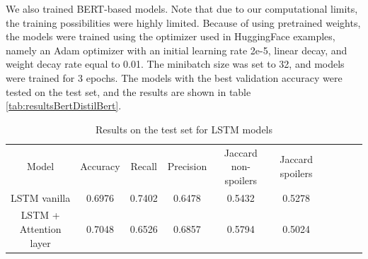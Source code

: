 \documentclass[11pt]{article}
\begin{document}
We also trained BERT-based models. Note that due to our computational limits, the training possibilities were highly limited. Because of using pretrained weights, the models were trained using the optimizer used in HuggingFace examples, namely an Adam optimizer with an initial learning rate 2e-5, linear decay, and weight decay rate equal to 0.01. The minibatch size was set to 32, and models were trained for 3 epochs. The models with the best validation accuracy were tested on the test set, and the results are shown in table \ref{tab:resultsBertDistilBert}.




\begin{table}[t]
\centering
\begin{tabular}{llllllllll}
\cline{1-6}
\multicolumn{1}{|c|}{Model}                  & \multicolumn{1}{c|}{Accuracy} & \multicolumn{1}{c|}{Recall} & \multicolumn{1}{c|}{Precision} & \multicolumn{1}{c|}{Jaccard non-spoilers} & \multicolumn{1}{c|}{Jaccard spoilers} &  &  &  &  \\ \cline{1-6}
\multicolumn{1}{|c|}{LSTM vanilla}           & \multicolumn{1}{c|}{0.6976}   & \multicolumn{1}{c|}{0.7402} & \multicolumn{1}{c|}{0.6478}    & \multicolumn{1}{c|}{0.5432}               & \multicolumn{1}{c|}{0.5278}           &  &  &  &  \\ \cline{1-6}
\multicolumn{1}{|c|}{LSTM + Attention layer} & \multicolumn{1}{c|}{0.7048}   & \multicolumn{1}{c|}{0.6526} & \multicolumn{1}{c|}{0.6857}    & \multicolumn{1}{c|}{0.5794}               & \multicolumn{1}{c|}{0.5024}           &  &  &  &  \\ \cline{1-6} 
\end{tabular}
    \caption{Results on the test set for LSTM models}
    \label{tab:resultsLSTM}
\end{table}
\end{document}
